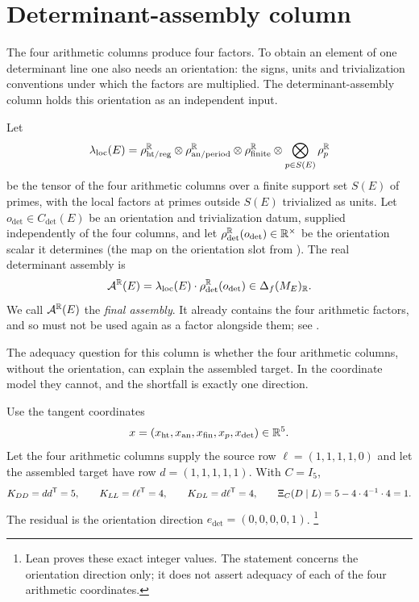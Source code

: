 \section{Determinant-assembly column}
\label{sec:det-assembly}

The four arithmetic columns produce four factors.  To obtain an element of
one determinant line one also needs an orientation: the signs, units and
trivialization conventions under which the factors are multiplied.  The
determinant-assembly column holds this orientation as an independent
input.

\begin{definition}\label{def:apparatus:det-assembly-map}
Let
\[
  \lambda_{\mathrm{loc}}(E)
  =
  \rho_{\mathrm{ht/reg}}^{\mathbb{R}}
  \otimes
  \rho_{\mathrm{an/period}}^{\mathbb{R}}
  \otimes
  \rho_{\mathrm{finite}}^{\mathbb{R}}
  \otimes
  \bigotimes_{p\in S(E)}\rho_p^{\mathbb{R}}
\]
be the tensor of the four arithmetic columns over a finite support set
$S(E)$ of primes, with the local factors at primes outside $S(E)$
trivialized as units.  Let $o_{\det}\in C_{\det}(E)$ be an orientation and
trivialization datum, supplied independently of the four columns, and let
$\rho_{\det}^{\mathbb{R}}(o_{\det})\in\mathbb{R}^\times$ be the orientation scalar it
determines (the map on the orientation slot from
).  The real determinant assembly is
\[
  \mathcal A^{\mathbb{R}}(E)
  =
  \lambda_{\mathrm{loc}}(E)\cdot\rho_{\det}^{\mathbb{R}}(o_{\det})
  \in\Delta_f(M_E)_{\mathbb{R}}.
\]
We call $\mathcal A^{\mathbb{R}}(E)$ the \emph{final assembly}.  It already
contains the four arithmetic factors, and so must not be used again as a
factor alongside them; see .
\end{definition}

The adequacy question for this column is whether the four arithmetic
columns, without the orientation, can explain the assembled target.  In
the coordinate model they cannot, and the shortfall is exactly one
direction.

\begin{theorem}\label{thm:apparatus:cascade-completion-signature}
Use the tangent coordinates
\[
  x=(x_{\mathrm{ht}},x_{\mathrm{an}},x_{\mathrm{fin}},x_p,x_{\det})\in\mathbb{R}^5 .
\]
Let the four arithmetic columns supply the source row
$\ell=(1,1,1,1,0)$ and let the assembled target have row
$d=(1,1,1,1,1)$.  With $C=I_5$,
\[
  K_{DD}=dd^{\mathsf T}=5,\qquad
  K_{LL}=\ell\ell^{\mathsf T}=4,\qquad
  K_{DL}=d\ell^{\mathsf T}=4,
  \qquad
  \Xi_C(D\mid L)=5-4\cdot4^{-1}\cdot4=1.
\]
The residual is the orientation direction $e_{\det}=(0,0,0,0,1)$.%
\footnote{Lean proves these exact integer values.  The statement concerns
the orientation direction only; it does not assert adequacy of each of the
four arithmetic coordinates.}
\end{theorem}


